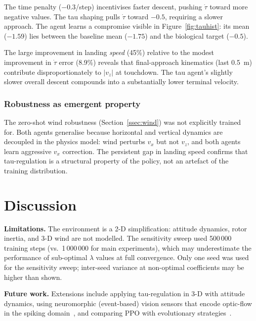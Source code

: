\documentclass[10pt,twocolumn]{article}
\begin{document}
The time penalty ($-0.3$/step) incentivises faster descent, pushing $\dot{\tau}$
toward more negative values.
The tau shaping pulls $\dot{\tau}$ toward $-0.5$, requiring a slower approach.
The agent learns a compromise visible in Figure~\ref{fig:tauhist}: its mean
($-1.59$) lies between the baseline mean ($-1.75$) and the biological target
($-0.5$).

The large improvement in landing \emph{speed} (45\%) relative to the modest
improvement in $\dot{\tau}$ error (8.9\%) reveals that final-approach
kinematics (last 0.5~m) contribute disproportionately to $|v_z|$ at
touchdown.
The tau agent's slightly slower overall descent compounds into a substantially
lower terminal velocity.

\subsubsection*{Robustness as emergent property}

The zero-shot wind robustness (Section~\ref{ssec:wind}) was not explicitly
trained for.
Both agents generalise because horizontal and vertical dynamics are decoupled
in the physics model: wind perturbs $v_x$ but not $v_z$, and both agents
learn aggressive $v_x$ correction.
The persistent gap in landing speed confirms that tau-regulation is a
structural property of the policy, not an artefact of the training
distribution.

\section{Discussion}
\label{sec:discussion}

\textbf{Limitations.}
The environment is a 2-D simplification: attitude dynamics, rotor inertia,
and 3-D wind are not modelled.
The sensitivity sweep used 500\,000 training steps (vs.\ 1\,000\,000 for
main experiments), which may underestimate the performance of sub-optimal
$\lambda$ values at full convergence.
Only one seed was used for the sensitivity sweep; inter-seed variance at
non-optimal coefficients may be higher than shown.

\textbf{Future work.}
Extensions include applying tau-regulation in 3-D with attitude dynamics,
using neuromorphic (event-based) vision sensors that encode optic-flow in the
spiking domain~\cite{clady2014}, and comparing PPO with evolutionary
strategies~\cite{such2017}.

\end{document}
